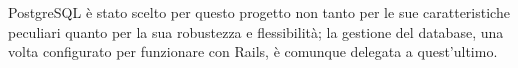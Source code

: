 PostgreSQL è stato scelto per questo progetto non tanto per le sue caratteristiche peculiari quanto per la sua robustezza e flessibilità; la gestione del database, una volta configurato per funzionare con Rails, è comunque delegata a quest'ultimo.






